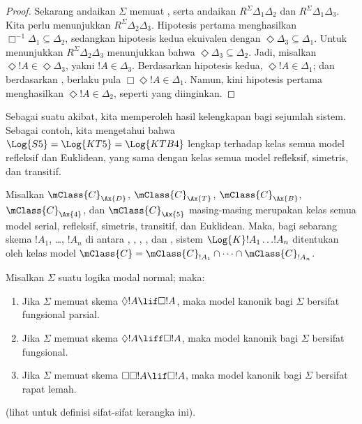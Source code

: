 \documentclass[../../../include/open-logic-section]{subfiles}
\begin{document}
\begin{proof}
  Sekarang andaikan $\Sigma$ memuat , serta andaikan $R^\Sigma
  \Delta_1\Delta_2$ dan $R^\Sigma \Delta_1\Delta_3$. Kita perlu menunjukkan
  $R^\Sigma \Delta_2\Delta_3$. Hipotesis pertama menghasilkan
  $\Box^{-1}\Delta_1 \subseteq \Delta_2$, sedangkan hipotesis kedua ekuivalen
  dengan $\Diamond\Delta_3 \subseteq \Delta_1$. Untuk menunjukkan
  $R^\Sigma \Delta_2\Delta_3$
  menunjukkan bahwa $\Diamond\Delta_3 \subseteq \Delta_2$. Jadi, misalkan
  $\Diamond!A \in \Diamond\Delta_3$, yakni $!A \in \Delta_3$. Berdasarkan
  hipotesis kedua, $\Diamond!A \in \Delta_1$; dan berdasarkan ,
  berlaku pula $\Box\Diamond!A \in \Delta_1$. Namun, kini hipotesis pertama
  menghasilkan $\Diamond!A \in \Delta_2$, seperti yang diinginkan.
  \end{proof}

Sebagai suatu akibat, kita memperoleh hasil kelengkapan bagi sejumlah sistem.
Sebagai contoh, kita mengetahui bahwa $\Log{S5} = \Log{KT5} =
\Log{KTB4}$ lengkap terhadap kelas semua model refleksif dan Euklidean, yang
sama dengan kelas semua model refleksif, simetris, dan transitif.

\begin{thm}
  Misalkan $\mClass{C}_\Ax{D}$, $\mClass{C}_\Ax{T}$,
  $\mClass{C}_\Ax{B}$, $\mClass{C}_\Ax{4}$, dan
  $\mClass{C}_\Ax{5}$ masing-masing merupakan kelas semua model serial,
  refleksif, simetris, transitif, dan Euklidean. Maka, bagi sebarang skema
  $!A_1$, \dots, $!A_n$ di antara , , , , dan
  , sistem $\Log{K}!A_1 \dots !A_n$ ditentukan oleh kelas model
  $\mClass{C} = \mClass{C}_{!A_1} \cap \dots
  \cap \mClass{C}_{!A_n}$.
\end{thm}

\begin{prop}
  Misalkan $\Sigma$ suatu logika modal normal; maka:
  \begin{enumerate}
  \item{}%
    Jika $\Sigma$ memuat skema $\Diamond!A \lif \Box
    !A$, maka model kanonik bagi $\Sigma$ bersifat fungsional parsial.
  \item Jika $\Sigma$ memuat skema $\Diamond!A \liff \Box
    !A$, maka model kanonik bagi $\Sigma$ bersifat fungsional.
  \item Jika $\Sigma$ memuat skema $\Box\Box!A \lif \Box
    !A$, maka model kanonik bagi $\Sigma$ bersifat rapat lemah.
  \end{enumerate}
(lihat  untuk definisi sifat-sifat kerangka
  ini).
\end{prop}
\end{document}
